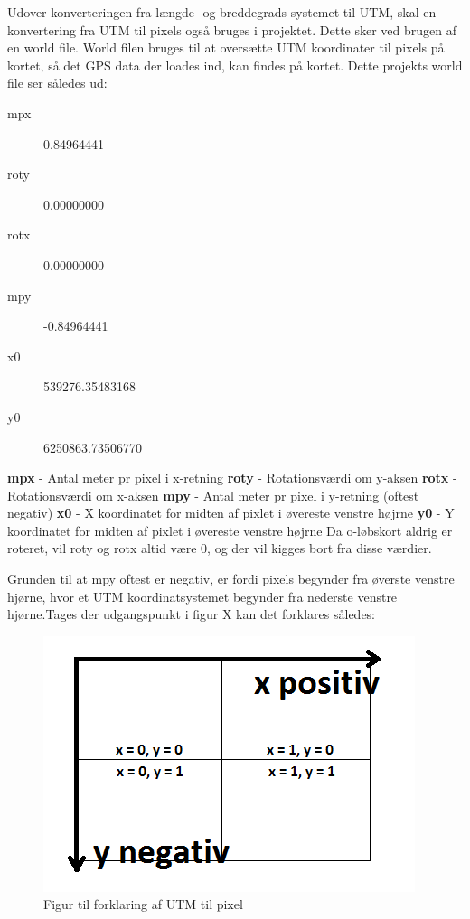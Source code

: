 Udover konverteringen fra længde- og breddegrads systemet til UTM, skal en konvertering fra UTM til pixels også bruges i projektet. Dette sker ved brugen af en world file. World filen bruges til at oversætte UTM koordinater til pixels på kortet, så det GPS data der loades ind, kan findes på kortet. Dette projekts world file ser således ud:
\begin{description}
	\item[mpx] 0.84964441
	\item[roty] 0.00000000
	\item[rotx] 0.00000000
	\item[mpy] -0.84964441
	\item[x0] 539276.35483168
	\item[y0] 6250863.73506770
\end{description}
\textbf{mpx} - Antal meter pr pixel i x-retning\newline
\textbf{roty} - Rotationsværdi om y-aksen\newline
\textbf{rotx} - Rotationsværdi om x-aksen\newline
\textbf{mpy} - Antal meter pr pixel i y-retning (oftest negativ)\newline
\textbf{x0} - X koordinatet for midten af pixlet i øvereste venstre højrne\newline
\textbf{y0} - Y koordinatet for midten af pixlet i øvereste venstre højrne\newline
Da o-løbskort aldrig er roteret, vil roty og rotx altid være 0, og der vil kigges bort fra disse værdier.

Grunden til at mpy oftest er negativ, er fordi pixels begynder fra øverste venstre hjørne, hvor et UTM koordinatsystemet begynder fra nederste venstre hjørne.Tages der udgangspunkt i figur X kan det forklares således:

\begin{figure} [h]
	\centering
	\includegraphics[width=.5\textwidth]{billeder/UTMtilPIXEL}
	\caption{Figur til forklaring af UTM til pixel}
\end{figure}

